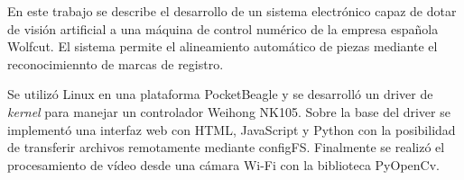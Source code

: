 En este trabajo se describe el desarrollo de un sistema electrónico capaz de dotar de visión artificial a una máquina de control numérico de la empresa española Wolfcut. El sistema permite el alineamiento automático de piezas mediante el reconocimiennto de marcas de registro.\par
Se utilizó Linux en una plataforma PocketBeagle y se desarrolló un driver de \textit{kernel} para manejar un controlador Weihong NK105. Sobre la base del driver se implementó una interfaz web con HTML, JavaScript y Python con la posibilidad de transferir archivos remotamente mediante configFS. Finalmente se realizó el procesamiento de vídeo desde una cámara Wi-Fi con la biblioteca PyOpenCv.

